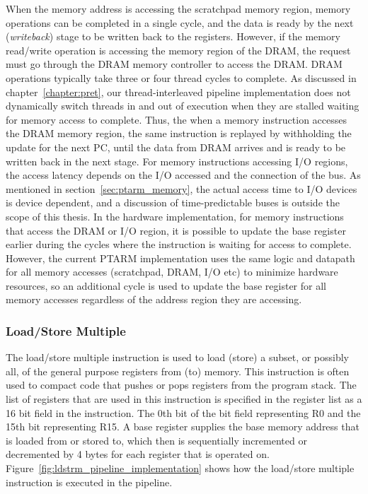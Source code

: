 When the memory address is accessing the scratchpad memory region, memory operations can be completed in a single cycle, and the data is ready by the next (\emph{writeback}) stage to be written back to the registers.
However, if the memory read/write operation is accessing the memory region of the DRAM, the request must go through the DRAM memory controller to access the DRAM. 
DRAM operations typically take three or four thread cycles to complete. 
As discussed in chapter~\ref{chapter:pret}, our thread-interleaved pipeline implementation does not dynamically switch threads in and out of execution when they are stalled waiting for memory access to complete. 
Thus, the when a memory instruction accesses the DRAM memory region, the same instruction is replayed by withholding the update for the next PC, until the data from DRAM arrives and is ready to be written back in the next stage.
For memory instructions accessing I/O regions, the access latency depends on the I/O accessed and the connection of the bus.  
As mentioned in section~\ref{sec:ptarm_memory}, the actual access time to I/O devices is device dependent, and a discussion of time-predictable buses is outside the scope of this thesis.
In the hardware implementation, for memory instructions that access the DRAM or I/O region, it is possible to update the base register earlier during the cycles where the instruction is waiting for access to complete.
However, the current PTARM implementation uses the same logic and datapath for all memory accesses (scratchpad, DRAM, I/O etc) to minimize hardware resources, so an additional cycle is used to update the base register for all memory accesses regardless of the address region they are accessing.

\subsubsection{Load/Store Multiple}
The load/store multiple instruction is used to load (store) a subset, or possibly all, of the general purpose registers from (to) memory.
This instruction is often used to compact code that pushes or pops registers from the program stack.
The list of registers that are used in this instruction is specified in the register list as a 16 bit field in the instruction.
The 0th bit of the bit field representing R0 and the 15th bit representing R15.
A base register supplies the base memory address that is loaded from or stored to, which then is sequentially incremented or decremented by 4 bytes for each register that is operated on. 
Figure~\ref{fig:ldstrm_pipeline_implementation} shows how the load/store multiple instruction is executed in the pipeline. 

